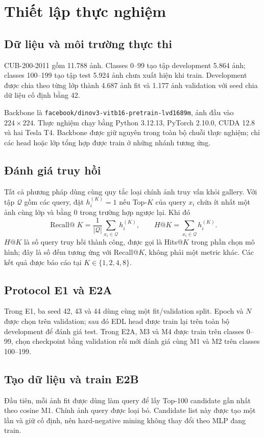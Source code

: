 \documentclass[11pt,a4paper]{article}
\begin{document}
\section{Thiết lập thực nghiệm}
\subsection{Dữ liệu và môi trường thực thi}
CUB-200-2011 gồm 11.788 ảnh. Classes 0--99 tạo tập development 5.864 ảnh;
classes 100--199 tạo tập test 5.924 ảnh chưa xuất hiện khi train. Development
được chia theo từng lớp thành 4.687 ảnh fit và 1.177 ảnh validation với seed
chia dữ liệu cố định bằng 42.

Backbone là \texttt{facebook/dinov3-vitb16-pretrain-lvd1689m}, ảnh đầu vào
$224\times224$. Thực nghiệm chạy bằng Python 3.12.13, PyTorch 2.10.0,
CUDA 12.8 và hai Tesla T4. Backbone được giữ nguyên trong toàn bộ chuỗi thực
nghiệm; chỉ các head hoặc lớp tổng hợp được train ở những nhánh tương ứng.

\subsection{Đánh giá truy hồi}
Tất cả phương pháp dùng cùng quy tắc loại chính ảnh truy vấn khỏi gallery.
Với tập $\mathcal{Q}$ gồm các query, đặt
$h_i^{(K)}=1$ nếu Top-$K$ của query $x_i$ chứa ít nhất một ảnh cùng lớp và
bằng 0 trong trường hợp ngược lại. Khi đó
\begin{equation}
 \operatorname{Recall@}K
 =\frac{1}{|\mathcal Q|}\sum_{x_i\in\mathcal Q}h_i^{(K)},
 \qquad H@K=\sum_{x_i\in\mathcal Q}h_i^{(K)}.
\end{equation}
$H@K$ là số query truy hồi thành công, được gọi là Hits@$K$ trong phần chọn
mô hình; đây là số đếm tương ứng với Recall@$K$, không phải một metric khác.
Các kết quả được báo cáo tại $K\in\{1,2,4,8\}$.

\subsection{Protocol E1 và E2A}
Trong E1, ba seed 42, 43 và 44 dùng cùng một fit/validation split. Epoch và
$N$ được chọn trên validation; sau đó EDL head được train lại trên toàn bộ
development để đánh giá test. Trong E2A, M3 và M4 được train trên classes
0--99, chọn checkpoint bằng validation rồi mới đánh giá cùng M1 và M2 trên
classes 100--199.

\subsection{Tạo dữ liệu và train E2B}
Đầu tiên, mỗi ảnh fit được dùng làm query để lấy Top-100 candidate gần nhất
theo cosine M1. Chính ảnh query được loại bỏ. Candidate list này được tạo một
lần và giữ cố định, nên hard-negative mining không thay đổi theo MLP đang
train.
\end{document}
